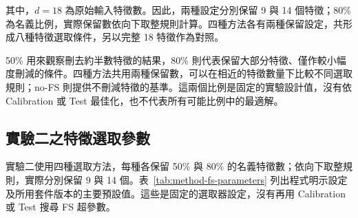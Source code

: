 其中，\(d=18\) 為原始輸入特徵數。因此，兩種設定分別保留 9 與 14 個特徵；80\% 為名義比例，實際保留數依向下取整規則計算。四種方法各有兩種保留設定，共形成八種特徵選取條件，另以完整 18 特徵作為對照。

50\% 用來觀察刪去約半數特徵的結果，80\% 則代表保留大部分特徵、僅作較小幅度刪減的條件。四種方法共用兩種保留數，可以在相近的特徵數量下比較不同選取規則；no-FS 則提供不刪減特徵的基準。這兩個比例是固定的實驗設計值，沒有依 Calibration 或 Test 最佳化，也不代表所有可能比例中的最適解。

\subsection{實驗二之特徵選取參數}\label{sec:method-fs-parameters}

實驗二使用四種選取方法，每種各保留 50\% 與 80\% 的名義特徵數；依向下取整規則，實際分別保留 9 與 14 個。表~\ref{tab:method-fs-parameters} 列出程式明示設定及所用套件版本的主要預設值。這些是固定的選取器設定，沒有再用 Calibration 或 Test 搜尋 FS 超參數。


